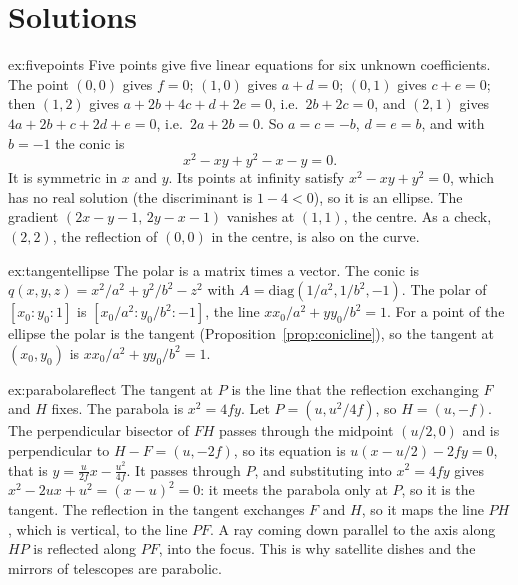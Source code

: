 \section{Solutions}

\begin{solution}{ex:fivepoints}
\idea Five points give five linear equations for six unknown coefficients.
\writeup The point $(0,0)$ gives $f=0$; $(1,0)$ gives $a+d=0$; $(0,1)$ gives $c+e=0$; then $(1,2)$ gives $a+2b+4c+d+2e=0$, i.e.\ $2b+2c=0$, and $(2,1)$
gives $4a+2b+c+2d+e=0$, i.e.\ $2a+2b=0$. So $a=c=-b$, $d=e=b$, and with $b=-1$ the conic is
\[
x^2-xy+y^2-x-y=0.
\]
It is symmetric in $x$ and $y$. Its points at infinity satisfy $x^2-xy+y^2=0$, which has no real solution (the discriminant is $1-4<0$), so it is an
ellipse. The gradient $(2x-y-1,\,2y-x-1)$ vanishes at $(1,1)$, the centre. As a check, $(2,2)$, the reflection of $(0,0)$ in the centre, is also on the curve.
\end{solution}

\begin{solution}{ex:tangentellipse}
\idea The polar is a matrix times a vector.
\writeup The conic is $q(x,y,z)=x^2/a^2+y^2/b^2-z^2$ with $A=\mathrm{diag}(1/a^2,1/b^2,-1)$. The polar of $[x_0:y_0:1]$ is $[x_0/a^2:y_0/b^2:-1]$, the line
$xx_0/a^2+yy_0/b^2=1$. For a point of the ellipse the polar is the tangent (Proposition~\ref{prop:conicline}), so the tangent at $(x_0,y_0)$ is
$xx_0/a^2+yy_0/b^2=1$.
\end{solution}

\begin{solution}{ex:parabolareflect}
\idea The tangent at $P$ is the line that the reflection exchanging $F$ and $H$ fixes.
\writeup The parabola is $x^2=4fy$. Let $P=(u,u^2/4f)$, so $H=(u,-f)$. The perpendicular bisector of $FH$ passes through the midpoint $(u/2,0)$ and is
perpendicular to $H-F=(u,-2f)$, so its equation is $u(x-u/2)-2fy=0$, that is $y=\frac{u}{2f}x-\frac{u^2}{4f}$. It passes through $P$, and
substituting into $x^2=4fy$ gives $x^2-2ux+u^2=(x-u)^2=0$: it meets the parabola only at $P$, so it is the tangent. The reflection in the tangent
exchanges $F$ and $H$, so it maps the line $PH$, which is vertical, to the line $PF$. A ray coming down parallel to the axis along $HP$ is reflected
along $PF$, into the focus. This is why satellite dishes and the mirrors of telescopes are parabolic.
\end{solution}

